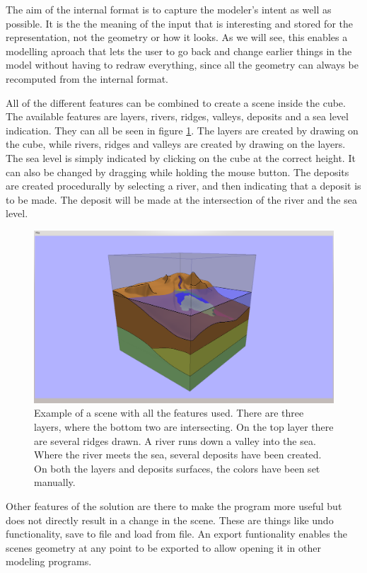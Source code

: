 \documentclass[a4paper,12pt]{report}
\begin{document}
The aim of the internal format is to capture the modeler's intent as well as possible. It is the the meaning of the input that is interesting and stored for the representation, not the geometry or how it looks. As we will see, this enables a modelling aproach that lets the user to go back and change earlier things in the model without having to redraw everything, since all the geometry can always be recomputed from the internal format.

All of the different features can be combined to create a scene inside the cube. The available features are layers, rivers, ridges, valleys, deposits and a sea level indication. They can all be seen in figure \ref{fig:allFeatures}. The layers are created by drawing on the cube, while rivers, ridges and valleys are created by drawing on the layers. The sea level is simply indicated by clicking on the cube at the correct height. It can also be changed by dragging while holding the mouse button. The deposits are created procedurally by selecting a river, and then indicating that a deposit is to be made. The deposit will be made at the intersection of the river and the sea level.

\begin{figure}
 \includegraphics[trim = 50mm 5mm 50mm 7mm, clip,width=\linewidth]{thesis/results/allFeatures.png}
 \caption{Example of a scene with all the features used. There are three layers, where the bottom two are intersecting. On the top layer there are several ridges drawn. A river runs down a valley into the sea. Where the river meets the sea, several deposits have been created. On both the layers and deposits surfaces, the colors have been set manually.}
 \label{fig:allFeatures}
\end{figure}

Other features of the solution are there to make the program more useful but does not directly result in a change in the scene. These are things like undo functionality, save to file and load from file. An export funtionality enables the scenes geometry at any point to be exported to allow opening it in other modeling programs.
\end{document}
